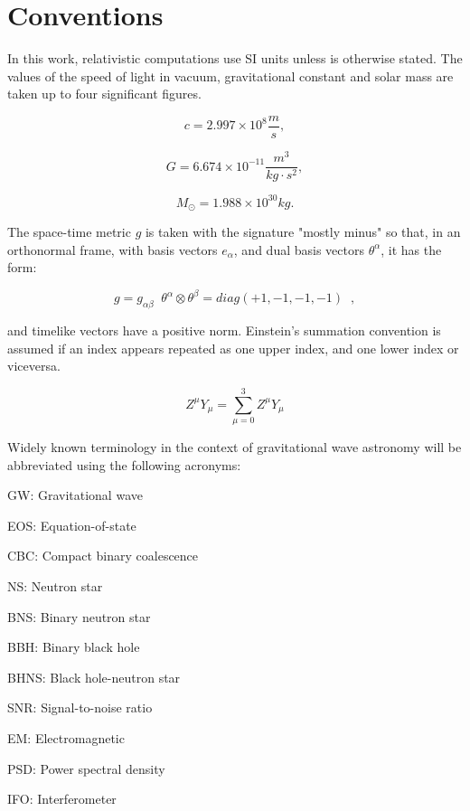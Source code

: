 \newpage
\chapter*{Conventions}
In this work, relativistic computations use SI units unless is otherwise stated. The values of the speed of light in vacuum\cite{si-brochure}, gravitational constant\cite{Anderson_2015} and solar mass are taken up to four significant figures.

$$ c = 2.997\times 10^8 \frac{m}{s}, $$

$$ G = 6.674\times 10^{-11}\frac{m^3}{kg\cdot s^2},$$

$$ M_{\odot} = 1.988 \times 10^{30} kg.$$

The space-time metric $g$ is taken with the signature "mostly minus" so that, in an orthonormal frame, with basis vectors $e_{\alpha}$, and dual basis vectors $\theta^{\alpha}$, it has the form:

$$ g = g_{\alpha \beta} \;\; \theta^{\alpha} \otimes \theta^{\beta} = diag(+1,-1,-1,-1)\;\; ,$$

and timelike vectors have a positive norm. Einstein's summation convention is assumed if an index appears repeated as one upper index, and one lower index or viceversa.

$$ Z^\mu Y_\mu = \sum_{\mu=0}^3 Z^\mu Y_\mu $$

Widely known terminology in the context of gravitational wave astronomy will be abbreviated using the following acronyms:

\vspace{1cm}

GW: Gravitational wave

EOS: Equation-of-state

CBC: Compact binary coalescence

NS: Neutron star

BNS: Binary neutron star

BBH: Binary black hole

BHNS: Black hole-neutron star 

SNR: Signal-to-noise ratio

EM: Electromagnetic

PSD: Power spectral density

IFO: Interferometer




